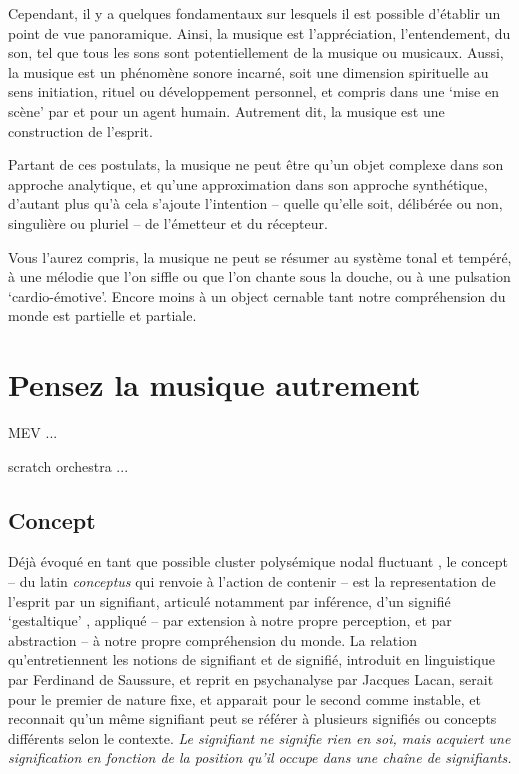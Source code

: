 \documentclass{article}
\newcommand{\footref}[1]{%
  \enotezwritemark{\enmarkstyle\ref{#1}}%
}
\begin{document}
Cependant, il y a quelques fondamentaux sur lesquels il est possible d'établir un point de vue panoramique. Ainsi, la musique est l'appréciation, l'entendement, du son, tel que tous les sons sont potentiellement de la musique ou musicaux. Aussi, la musique est un phénomène sonore incarné, soit une dimension spirituelle au sens initiation, rituel ou développement personnel, et compris dans une `mise en scène' par et pour un agent humain. Autrement dit, la musique est une construction de l'esprit.

\bigskip

Partant de ces postulats, la musique ne peut être qu'un objet complexe dans son approche analytique, et qu'une approximation dans son approche synthétique, d'autant plus qu'à cela s'ajoute l'intention -- quelle qu'elle soit, délibérée ou non, singulière ou pluriel -- de l'émetteur et du récepteur. 



Vous l'aurez compris, la musique ne peut se résumer au système tonal et tempéré, à une mélodie que l'on siffle ou que l'on chante sous la douche, ou à une pulsation `cardio-émotive'. Encore moins à un object cernable tant notre compréhension du monde est partielle et partiale. 

%  
%
\section{Pensez la musique autrement}

MEV ...

scratch orchestra ...


\subsection{Concept} %

Déjà évoqué en tant que possible cluster polysémique nodal fluctuant\footref{efn:concept}, le concept -- du latin \textit{conceptus} qui renvoie à l'action de contenir -- est la representation de l'esprit par un signifiant, articulé notamment par inférence, d'un signifié `gestaltique'\footref{efn:gestalt}, appliqué -- par extension à notre propre perception, et par abstraction -- à notre propre compréhension du monde. La relation qu'entretiennent les notions de signifiant et de signifié, introduit en linguistique par Ferdinand de Saussure, et reprit en psychanalyse par Jacques Lacan, serait pour le premier de nature fixe, et apparait pour le second comme instable, et reconnait qu'un même signifiant peut se référer à plusieurs signifiés ou concepts différents selon le contexte.  \textit{Le signifiant ne signifie rien en soi, mais acquiert une signification en fonction de la position qu’il occupe dans une chaîne de signifiants.}
\end{document}
